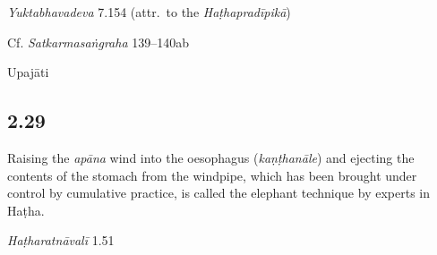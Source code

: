 \begin{ekdosis}
\begin{testimonia}[hp02_028]
\emph{Yuktabhavadeva} 7.154 (attr.~to the \emph{Haṭhapradīpikā})

\begin{versinnote}
\end{versinnote}

Cf. \emph{Satkarmasaṅgraha} 139–140ab

\begin{versinnote}
\end{versinnote}
\end{testimonia}


\begin{metre}[hp02_028]
Upajāti
\end{metre}

\subsection*{2.29}
\begin{translation}[hp02_029]
Raising the \emph{apāna} wind into the oesophagus (\emph{kaṇṭhanāle}) and ejecting the contents of the stomach from the windpipe, which has been brought under control by cumulative practice, is called the elephant technique by experts in Haṭha.
\end{translation}

\begin{sources}[hp02_029]
\end{sources}

\begin{testimonia}[hp02_029]
\emph{Haṭharatnāvalī} 1.51

\begin{versinnote}
\end{versinnote}


\end{testimonia}
\end{ekdosis}

